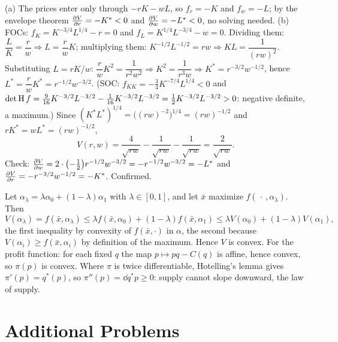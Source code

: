 \begin{solutions}
  \item (a) The prices enter only through $-rK-wL$, so
        $f_r=-K$ and $f_w=-L$; by the envelope theorem
        $\frac{\partial V}{\partial r}=-K^*<0$ and $\frac{\partial V}{\partial w}=-L^*<0$, no solving
        needed. (b) FOCs: $f_K=K^{-3/4}L^{1/4}-r=0$ and
        $f_L=K^{1/4}L^{-3/4}-w=0$. Dividing them:
        $\dfrac{L}{K}=\dfrac{r}{w}\Rightarrow L=\dfrac rwK$;
        multiplying them:
        $K^{-1/2}L^{-1/2}=rw\Rightarrow KL=\dfrac{1}{(rw)^2}$.
        Substituting $L=rK/w$:
        $\dfrac rwK^2=\dfrac{1}{r^2w^2}\Rightarrow
        K^2=\dfrac{1}{r^3w}\Rightarrow K^*=r^{-3/2}w^{-1/2}$, hence
        $L^*=\dfrac rwK^*=r^{-1/2}w^{-3/2}$. (SOC:
        $f_{KK}=-\tfrac34K^{-7/4}L^{1/4}<0$ and
        $\det\operatorname{H} f=\tfrac9{16}K^{-3/2}L^{-3/2}
        -\tfrac1{16}K^{-3/2}L^{-3/2}
        =\tfrac12K^{-3/2}L^{-3/2}>0$: negative definite, a maximum.)
        Since $(K^*L^*)^{1/4}=\bigl((rw)^{-2}\bigr)^{1/4}=(rw)^{-1/2}$
        and $rK^*=wL^*=(rw)^{-1/2}$,
        \[
          V(r,w)=\frac{4}{\sqrt{rw}}-\frac{1}{\sqrt{rw}}
          -\frac{1}{\sqrt{rw}}=\frac{2}{\sqrt{rw}}.
        \]
        Check: $\frac{\partial V}{\partial w}=2\cdot\bigl(-\tfrac12\bigr)r^{-1/2}w^{-3/2}
        =-r^{-1/2}w^{-3/2}=-L^*$ and
        $\frac{\partial V}{\partial r}=-r^{-3/2}w^{-1/2}=-K^*$. Confirmed.

  \item Let $\alpha_\lambda=\lambda\alpha_0+(1-\lambda)\alpha_1$ with
        $\lambda\in[0,1]$, and let $\bar x$ maximize
        $f(\,\cdot\,,\alpha_\lambda)$. Then
        \[
          V(\alpha_\lambda)=f(\bar x,\alpha_\lambda)
          \le\lambda f(\bar x,\alpha_0)+(1-\lambda)f(\bar x,\alpha_1)
          \le\lambda V(\alpha_0)+(1-\lambda)V(\alpha_1),
        \]
        the first inequality by convexity of $f(\bar x,\cdot)$ in
        $\alpha$, the second because $V(\alpha_i)\ge f(\bar x,\alpha_i)$
        by definition of the maximum. Hence $V$ is convex. For the
        profit function: for each fixed $q$ the map $p\mapsto pq-C(q)$
        is affine, hence convex, so $\pi(p)$ is convex. Where $\pi$ is
        twice differentiable, Hotelling's lemma gives
        $\pi'(p)=q^*(p)$, so $\pi''(p)=\dd{q^*}{p}\ge0$: supply cannot
        slope downward, the law of supply.
\end{solutions}

\section{Additional Problems}

